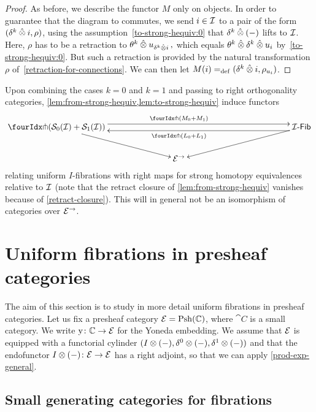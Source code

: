 \documentclass[reqno,10pt,a4paper,oneside,draft]{amsart}
\begin{document}
\begin{proof}
As before, we describe the functor $M$ only on objects.
In order to guarantee that the diagram to commutes, we send $i \in \cal{I}$ to a pair of the form $(\kcyl \hatotimes i, \rho)$, using the assumption~\eqref{to-strong-hequiv:0} that $\kcyl \hatotimes (-)$ lifts to $\cal{I}$.
Here, $\rho$ has to be a retraction to $\thetak \hatotimes u_{\kcyl \hatotimes i}\, ,$ which equals $\thetak \hatotimes \kcyl \hatotimes u_i$ by~\eqref{to-strong-hequiv:0}.
But such a retraction is provided by the natural transformation $\rho$ of~\cref{retraction-for-connections}.
We can then let $M(i) \defeq (\kcyl \hatotimes i, \rho_{u_i})$.
\end{proof}

\begin{remark} \label{relating-strong-hequiv-and-uniform-fib}
Upon combining the cases $k = 0$ and $k = 1$ and passing to right orthogonality categories, \cref{lem:from-strong-hequiv,lem:to-strong-hequiv} induce functors
\[
\xymatrix@!C{
  \liftr{(\cal{S}_0(\cal{I}) + \cal{S}_1(\cal{I}))}
  \ar[dr]
  \ar@<4pt>[rr]^{\liftr{(M_0 + M_1)}}
&&
  \Fib[\cal{I}]
  \ar[dl]
  \ar@<4pt>[ll]^{\liftr{(L_0 + L_1)}}
\\&
  \catE^\to
}
\]
relating uniform $I$-fibrations with right maps for strong homotopy equivalences relative to $\cal{I}$ (note that the retract closure of \cref{lem:from-strong-hequiv} vanishes because of \cref{retract-closure}).
This will in general not be an isomorphism of categories over $\catE^\to$.
\end{remark}


\section{Uniform fibrations in presheaf categories}
\label{sec:unifpc}

The aim of this section is to study in more detail uniform fibrations in presheaf categories.
Let us fix a presheaf category $\catE = \Psh(\cat{C})$, where $\cat{C}$ is a small category.
We write $\yon \co \catC \to \catE$ for the Yoneda embedding.
We assume that $\catE$ is equipped with a functorial cylinder $( \interval \otimes (-), \lcyl \otimes (-), \rcyl \otimes (-))$ and that the endofunctor $ \interval\otimes (-) \co \catE \to \catE$ has a right adjoint, so that we can apply \cref{prod-exp-general}.

\subsection*{Small generating categories for fibrations}
\end{document}
